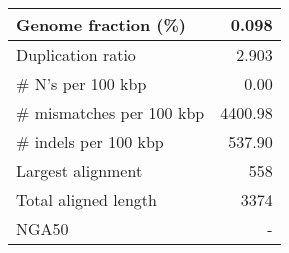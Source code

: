 \documentclass[12pt,a4paper]{article}
\begin{document}
\begin{table}[ht]
\begin{center}
\begin{tabular}{|l*{1}{|r}|}
Genome fraction (\%) & 0.098 \\ \hline
Duplication ratio & 2.903 \\ \hline
\# N's per 100 kbp & 0.00 \\ \hline
\# mismatches per 100 kbp & 4400.98 \\ \hline
\# indels per 100 kbp & 537.90 \\ \hline
Largest alignment & 558 \\ \hline
Total aligned length & 3374 \\ \hline
NGA50 & - \\ \hline
\end{tabular}
\end{center}
\end{table}
\end{document}
